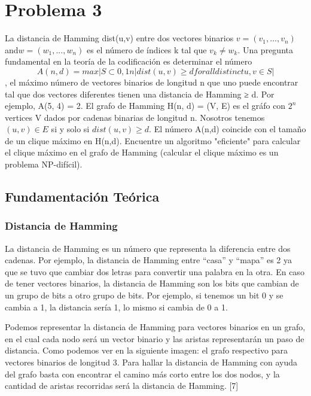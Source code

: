 \documentclass[conference,compsoc]{IEEEtran}
\begin{document}
\section{Problema 3}

La distancia de Hamming dist(u,v) entre dos vectores binarios $v = (v_{1} , . . . , v_{n} ) $and$ w = (w_{1} , . . . , w_{n} )$ es el número de índices k tal que $v_{k} \neq w_k$. Una pregunta fundamental en la teoría de la codificación es determinar el número 
$$A(n, d) = max |{S ⊂ {0, 1} n | dist(u, v) ≥ d for all distinct u, v ∈ S}|$$, 
el máximo número de vectores binarios de longitud n que uno puede encontrar tal que dos vectores diferentes tienen una distancia de Hamming ≥ d.  Por ejemplo, A(5, 4) = 2. 
El grafo de Hamming H(n, d) = (V, E) es el gráfo con $2^{n}$ vertices V dados por cadenas binarias de longitud n. Nosotros tenemos $(u, v) ∈ E$ si y solo si $dist(u, v) ≥ d$. El número A(n,d) coincide con el tamaño de un clique máximo en H(n,d). Encuentre un algoritmo "eficiente"  para calcular el clique máximo en el grafo de Hamming (calcular el clique máximo es un problema NP-difícil).

\subsection{Fundamentación Teórica}
\subsubsection{Distancia de Hamming}

La distancia de Hamming es un número que representa la diferencia entre dos cadenas. Por ejemplo, la distancia de Hamming entre “casa” y “mapa” es 2 ya que se tuvo que cambiar dos letras para convertir una palabra en la otra. En caso de tener vectores binarios, la distancia de Hamming son los bits que cambian de un grupo de bits a otro grupo de bits. Por ejemplo, si tenemos un bit 0 y se cambia a 1, la distancia sería 1, lo mismo si cambia de 0 a 1.

Podemos representar la distancia de Hamming para vectores binarios en un grafo, en el cual cada nodo será un vector binario y las aristas representarán un paso de distancia. Como podemos ver en la siguiente imagen: el grafo respectivo para vectores binarios de longitud 3. Para hallar la distancia de Hamming con ayuda del grafo basta con encontrar el camino más corto entre los dos nodos, y la cantidad de aristas recorridas será la distancia de Hamming. [7]
\end{document}
